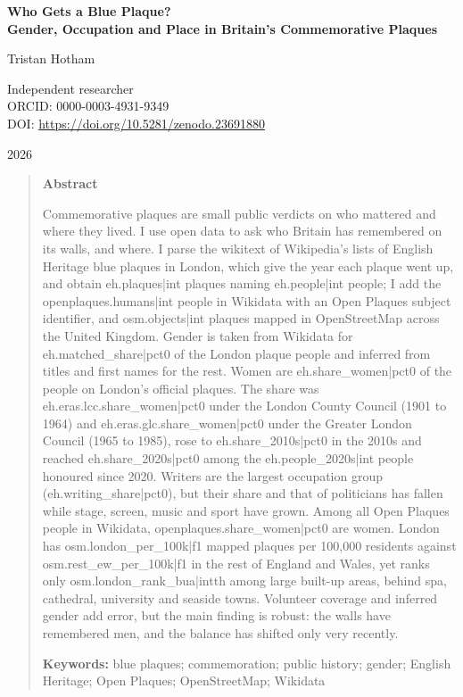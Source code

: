 \documentclass[11pt,a4paper]{article}
\begin{document}
\begin{center}
{\Large\bfseries Who Gets a Blue Plaque?\\[2pt] Gender, Occupation and Place in Britain's Commemorative Plaques\par}
\vspace{1.2em}
{\large Tristan Hotham\par}
\vspace{0.3em}
{\small Independent researcher\\
ORCID: 0000-0003-4931-9349\\
DOI: \href{https://doi.org/10.5281/zenodo.23691880}{https://doi.org/10.5281/zenodo.23691880}\par}
\vspace{0.8em}
2026
\end{center}

\begin{quote}
\small
\begin{center}\textbf{Abstract}\end{center}
Commemorative plaques are small public verdicts on who mattered and where they lived. I use open data to ask who Britain has remembered on its walls, and where. I parse the wikitext of Wikipedia's lists of English Heritage blue plaques in London, which give the year each plaque went up, and obtain {{eh.plaques|int}} plaques naming {{eh.people|int}} people; I add the {{openplaques.humans|int}} people in Wikidata with an Open Plaques subject identifier, and {{osm.objects|int}} plaques mapped in OpenStreetMap across the United Kingdom. Gender is taken from Wikidata for {{eh.matched_share|pct0}} of the London plaque people and inferred from titles and first names for the rest. Women are {{eh.share_women|pct0}} of the people on London's official plaques. The share was {{eh.eras.lcc.share_women|pct0}} under the London County Council (1901 to 1964) and {{eh.eras.glc.share_women|pct0}} under the Greater London Council (1965 to 1985), rose to {{eh.share_2010s|pct0}} in the 2010s and reached {{eh.share_2020s|pct0}} among the {{eh.people_2020s|int}} people honoured since 2020. Writers are the largest occupation group ({{eh.writing_share|pct0}}), but their share and that of politicians has fallen while stage, screen, music and sport have grown. Among all Open Plaques people in Wikidata, {{openplaques.share_women|pct0}} are women. London has {{osm.london_per_100k|f1}} mapped plaques per 100,000 residents against {{osm.rest_ew_per_100k|f1}} in the rest of England and Wales, yet ranks only {{osm.london_rank_bua|int}}th among large built-up areas, behind spa, cathedral, university and seaside towns. Volunteer coverage and inferred gender add error, but the main finding is robust: the walls have remembered men, and the balance has shifted only very recently.

\textbf{Keywords:} blue plaques; commemoration; public history; gender; English Heritage; Open Plaques; OpenStreetMap; Wikidata
\end{quote}
\end{document}
